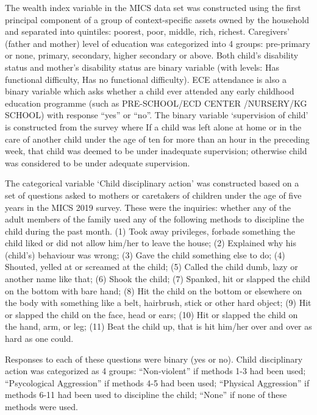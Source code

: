 \documentclass[
  12pt,
  oneside]{report}
\begin{document}
The wealth index variable in the MICS data set was constructed using the first principal component of a group of context-specific assets owned by the household and separated into quintiles: poorest, poor, middle, rich, richest. Caregivers' (father and mother) level of education was categorized into 4 groups: pre-primary or none, primary, secondary, higher secondary or above. Both child's disability status and mother's disability status are binary variable (with levels: Has functional difficulty, Has no functional difficulty). ECE attendance is also a binary variable which asks whether a child ever attended any early childhood education programme (such as PRE-SCHOOL/ECD CENTER /NURSERY/KG SCHOOL) with response ``yes'' or ``no''. The binary variable `supervision of child' is constructed from the survey where If a child was left alone at home or in the care of another child under the age of ten for more than an hour in the preceding week, that child was deemed to be under inadequate supervision; otherwise child was considered to be under adequate supervision.

The categorical variable `Child disciplinary action' was constructed based on a set of questions asked to mothers or caretakers of children under the age of five years in the MICS 2019 survey. These were the inquiries: whether any of the adult members of the family used any of the following methods to discipline the child during the past month. (1) Took away privileges, forbade something the child liked or did not allow him/her to leave the house; (2) Explained why his (child's) behaviour was wrong; (3) Gave the child something else to do; (4) Shouted, yelled at or screamed at the child; (5) Called the child dumb, lazy or another name like that; (6) Shook the child; (7) Spanked, hit or slapped the child on the bottom with bare hand; (8) Hit the child on the bottom or elsewhere on the body with something like a belt, hairbrush, stick or other hard object; (9) Hit or slapped the child on the face, head or ears; (10) Hit or slapped the child on the hand, arm, or leg; (11) Beat the child up, that is hit him/her over and over as hard as one could.

Responses to each of these questions were binary (yes or no). Child disciplinary action was categorized as 4 groups: ``Non-violent'' if methods 1-3 had been used; ``Psycological Aggression'' if methods 4-5 had been used; ``Physical Aggression'' if methods 6-11 had been used to discipline the child; ``None'' if none of these methods were used.
\end{document}
